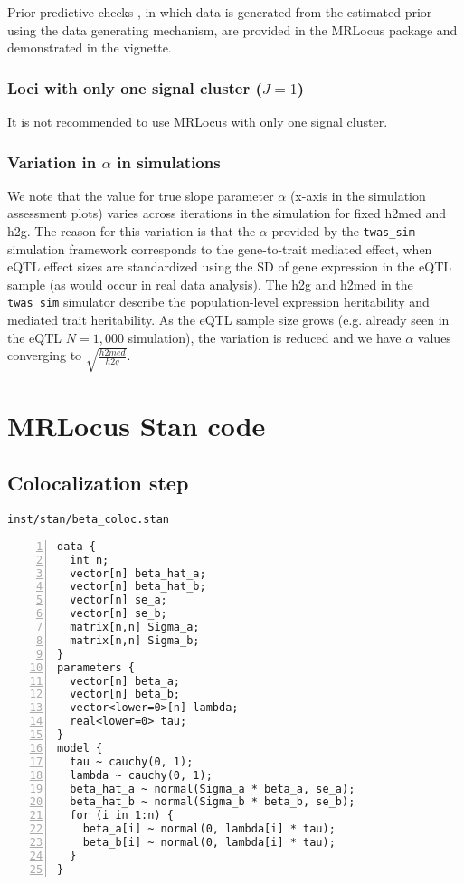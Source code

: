 \documentclass[11pt]{article}
\begin{document}
Prior predictive checks \citep{Gabry2019}, in which data is generated
from the estimated prior using the data generating mechanism, are
provided in the MRLocus package and demonstrated in the vignette.

\subsubsection{Loci with only one signal cluster ($J=1$)}

It is not recommended to use MRLocus with only one signal cluster.

\subsubsection{Variation in $\alpha$ in simulations}

We note that the value for true slope parameter $\alpha$ (x-axis in
the simulation assessment plots) varies across iterations in the
simulation for fixed h2med and h2g. The reason for this variation is
that the $\alpha$ provided by the \texttt{twas\_sim} simulation
framework corresponds to the gene-to-trait mediated effect, when eQTL
effect sizes are standardized using the SD of gene expression in the
eQTL sample (as would occur in real data analysis). The h2g and h2med
in the \texttt{twas\_sim} simulator describe the population-level
expression heritability and mediated trait heritability. As the eQTL
sample size grows (e.g. already seen in the eQTL $N=1,000$
simulation), the variation is reduced and we have $\alpha$ values
converging to $\sqrt{\frac{h2med}{h2g}}$.

\newpage

\section{MRLocus Stan code}

\subsection{Colocalization step}

\texttt{inst/stan/beta\_coloc.stan}

\begin{Verbatim}[frame=single,numbers=left]
data {
  int n;
  vector[n] beta_hat_a;
  vector[n] beta_hat_b;
  vector[n] se_a;
  vector[n] se_b;
  matrix[n,n] Sigma_a;
  matrix[n,n] Sigma_b;
}
parameters {
  vector[n] beta_a;
  vector[n] beta_b;
  vector<lower=0>[n] lambda;
  real<lower=0> tau;
}
model {
  tau ~ cauchy(0, 1);
  lambda ~ cauchy(0, 1);
  beta_hat_a ~ normal(Sigma_a * beta_a, se_a);
  beta_hat_b ~ normal(Sigma_b * beta_b, se_b);
  for (i in 1:n) {
    beta_a[i] ~ normal(0, lambda[i] * tau);
    beta_b[i] ~ normal(0, lambda[i] * tau);
  }
}
\end{Verbatim}
\end{document}
